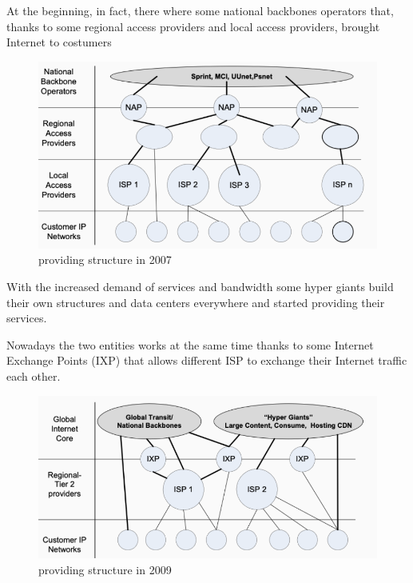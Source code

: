         \FloatBarrier
        At the beginning, in fact, there where some national backbones operators that, thanks to some regional access providers and local access providers, brought Internet to costumers

        \begin{figure}[h!]
            \centering
            \includegraphics[scale=0.3]{images/providing structure 1.png}
            \caption{providing structure in 2007}
            \label{fig:nettiers}
        \end{figure}
        \FloatBarrier
        
        With the increased demand of services and bandwidth some hyper giants build their own structures and data centers everywhere and started providing their services.
        
        \FloatBarrier
        Nowadays the two entities works at the same time thanks to some Internet Exchange Points (IXP) that allows different ISP to exchange their Internet traffic each other.
        \begin{figure}[h!]
            \centering
            \includegraphics[scale=0.3]{images/providing structure 2.png}
            \caption{providing structure in 2009}
            \label{fig:nettiers}
        \end{figure}
        \FloatBarrier
        
